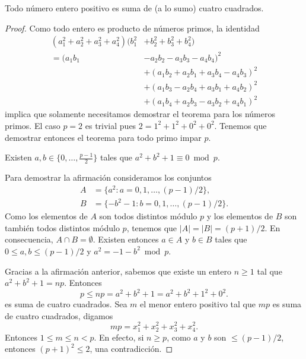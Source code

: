 \begin{theorem}[Lagrange]
	Todo número entero positivo es suma de (a lo sumo) cuatro cuadrados.	
\end{theorem}

\begin{proof}
	Como todo entero es producto de números primos, 
	la identidad 
	\begin{equation}
		\begin{aligned}
			\label{eq:Euler}
			(a_1^2+a_2^2+a_3^2+a_4^2)(b_1^2&+b_2^2+b_3^2+b_4^2)\\
			=(a_1 b_1 &- a_2 b_2 - a_3 b_3 - a_4 b_4)^2\\
			&+(a_1 b_2 + a_2 b_1 + a_3 b_4 - a_4 b_3)^2\\
			&+(a_1 b_3 - a_2 b_4 + a_3 b_1 + a_4 b_2)^2\\
			&+(a_1 b_4 + a_2 b_3 - a_3 b_2 + a_4 b_1)^2
		\end{aligned}
	\end{equation}
	implica que solamente necesitamos demostrar el teorema para los números
	primos. El caso $p=2$ es trivial pues $2=1^2+1^2+0^2+0^2$. Tenemos que
	demostrar entonces el teorema para todo primo impar $p$. 

	\begin{claim}
		Existen $a,b\in\{0,\dots,\frac{p-1}{2}\}$ tales que
		$a^2+b^2+1\equiv0\bmod{p}$. 
	\end{claim}

	Para demostrar la afirmación consideramos los conjuntos 
	\begin{align*}
		A&=\{a^2:a=0,1,\dots,(p-1)/2\},\\
		B&=\{-b^2-1:b=0,1,\dots,(p-1)/2\}.
	\end{align*}
	Como los elementos de $A$ son todos distintos módulo $p$ y los elementos de
	$B$ son también todos distintos módulo $p$, tenemos que $|A|=|B|=(p+1)/2$.
	En consecuencia, $A\cap B=\emptyset$. Existen entonces $a\in A$ y $b\in B$
	tales que $0\leq a,b\leq (p-1)/2$ y $a^2=-1-b^2\bmod p$.

	\medskip
	Gracias a la afirmación anterior, sabemos que existe un entero $n\geq1$ tal
	que $a^2+b^2+1=np$. Entonces
	\[
		p\leq np=a^2+b^2+1=a^2+b^2+1^2+0^2.
	\]
	es suma de cuatro cuadrados. Sea $m$ el menor entero positivo tal que $mp$
	es suma de cuatro cuadrados, digamos
	\[
		mp=x_1^2+x_2^2+x_3^2+x_4^2.
	\]
	Entonces $1\leq m\leq n<p$. En efecto, si $n\geq p$, como $a$ y $b$ son
	$\leq(p-1)/2$, entonces $(p+1)^2\leq 2$, una contradicción. 


\end{proof}
